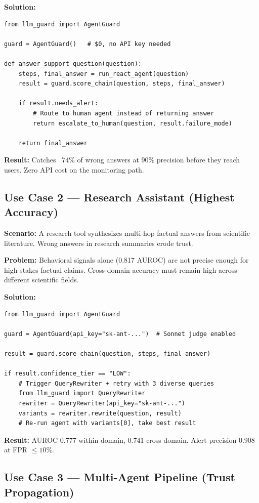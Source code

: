 \documentclass[11pt,a4paper]{article}
\begin{document}
\textbf{Solution:}

\begin{lstlisting}
from llm_guard import AgentGuard

guard = AgentGuard()   # $0, no API key needed

def answer_support_question(question):
    steps, final_answer = run_react_agent(question)
    result = guard.score_chain(question, steps, final_answer)

    if result.needs_alert:
        # Route to human agent instead of returning answer
        return escalate_to_human(question, result.failure_mode)

    return final_answer
\end{lstlisting}

\textbf{Result:} Catches ~74\% of wrong answers at 90\% precision before
they reach users. Zero API cost on the monitoring path.

\subsection{Use Case 2 --- Research Assistant (Highest Accuracy)}

\textbf{Scenario:} A research tool synthesizes multi-hop factual answers
from scientific literature. Wrong answers in research summaries erode trust.

\textbf{Problem:} Behavioral signals alone (0.817 AUROC) are not precise
enough for high-stakes factual claims. Cross-domain accuracy must remain
high across different scientific fields.

\textbf{Solution:}

\begin{lstlisting}
from llm_guard import AgentGuard

guard = AgentGuard(api_key="sk-ant-...")  # Sonnet judge enabled

result = guard.score_chain(question, steps, final_answer)

if result.confidence_tier == "LOW":
    # Trigger QueryRewriter + retry with 3 diverse queries
    from llm_guard import QueryRewriter
    rewriter = QueryRewriter(api_key="sk-ant-...")
    variants = rewriter.rewrite(question, result)
    # Re-run agent with variants[0], take best result
\end{lstlisting}

\textbf{Result:} AUROC 0.777 within-domain, 0.741 cross-domain.
Alert precision 0.908 at FPR $\leq 10\%$.

\subsection{Use Case 3 --- Multi-Agent Pipeline (Trust Propagation)}
\end{document}
